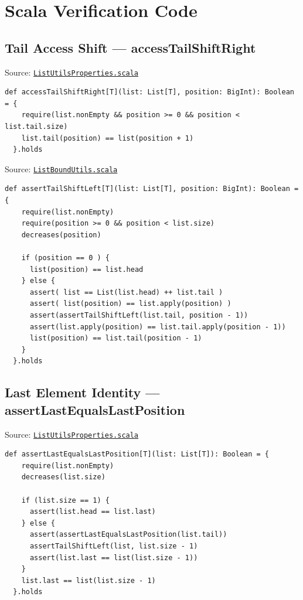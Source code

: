 \section{Scala Verification Code}
\label{sec:appendix-a}

\subsection{Tail Access Shift --- accessTailShiftRight}

Source:
\href{https://github.com/thiagomata/prime-numbers/blob/list-article-v1.0.0/src/main/scala/v1/chapter3/list/properties/ListUtilsProperties.scala}{\texttt{ListUtilsProperties.scala}}

\begin{lstlisting}[style=scala]
  def accessTailShiftRight[T](list: List[T], position: BigInt): Boolean = {
    require(list.nonEmpty && position >= 0 && position < list.tail.size)
    list.tail(position) == list(position + 1)
  }.holds
\end{lstlisting}

Source:
\href{https://github.com/thiagomata/prime-numbers/blob/list-article-v1.0.0/src/main/scala/v1/chapter3/list/ListBoundUtils.scala}{\texttt{ListBoundUtils.scala}}

\begin{lstlisting}[style=scala]
  def assertTailShiftLeft[T](list: List[T], position: BigInt): Boolean = {
    require(list.nonEmpty)
    require(position >= 0 && position < list.size)
    decreases(position)

    if (position == 0 ) {
      list(position) == list.head
    } else {
      assert( list == List(list.head) ++ list.tail )
      assert( list(position) == list.apply(position) )
      assert(assertTailShiftLeft(list.tail, position - 1))
      assert(list.apply(position) == list.tail.apply(position - 1))
      list(position) == list.tail(position - 1)
    }
  }.holds
\end{lstlisting}

\subsection{Last Element Identity --- assertLastEqualsLastPosition}

Source:
\href{https://github.com/thiagomata/prime-numbers/blob/list-article-v1.0.0/src/main/scala/v1/chapter3/list/properties/ListUtilsProperties.scala}{\texttt{ListUtilsProperties.scala}}

\begin{lstlisting}[style=scala]
  def assertLastEqualsLastPosition[T](list: List[T]): Boolean = {
    require(list.nonEmpty)
    decreases(list.size)

    if (list.size == 1) {
      assert(list.head == list.last)
    } else {
      assert(assertLastEqualsLastPosition(list.tail))
      assertTailShiftLeft(list, list.size - 1)
      assert(list.last == list(list.size - 1))
    }
    list.last == list(list.size - 1)
  }.holds
\end{lstlisting}

